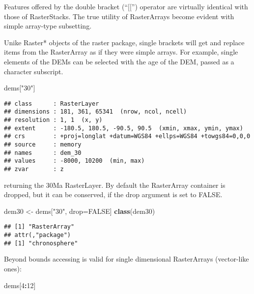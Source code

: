\documentclass[]{article}
\newenvironment{Shaded}{\begin{snugshade}}{\end{snugshade}}
\newcommand{\DecValTok}[1]{\textcolor[rgb]{0.00,0.00,0.81}{#1}}
\newcommand{\KeywordTok}[1]{\textcolor[rgb]{0.13,0.29,0.53}{\textbf{#1}}}
\newcommand{\NormalTok}[1]{#1}
\newcommand{\OperatorTok}[1]{\textcolor[rgb]{0.81,0.36,0.00}{\textbf{#1}}}
\newcommand{\OtherTok}[1]{\textcolor[rgb]{0.56,0.35,0.01}{#1}}
\newcommand{\StringTok}[1]{\textcolor[rgb]{0.31,0.60,0.02}{#1}}
\begin{document}
Features offered by the double bracket (``{[}{[}'') operator are
virtually identical with those of RasterStacks. The true utility of
RasterArrays become evident with simple array-type subsetting.

Unike Raster* objects of the raster package, single brackets will get
and replace items from the RasterArray as if they were simple arrays.
For example, single elements of the DEMs can be selected with the age of
the DEM, passed as a character subscript.

\begin{Shaded}
\begin{Highlighting}[]
\NormalTok{dems[}\StringTok{"30"}\NormalTok{]}
\end{Highlighting}
\end{Shaded}

\begin{verbatim}
## class      : RasterLayer 
## dimensions : 181, 361, 65341  (nrow, ncol, ncell)
## resolution : 1, 1  (x, y)
## extent     : -180.5, 180.5, -90.5, 90.5  (xmin, xmax, ymin, ymax)
## crs        : +proj=longlat +datum=WGS84 +ellps=WGS84 +towgs84=0,0,0 
## source     : memory
## names      : dem_30 
## values     : -8000, 10200  (min, max)
## zvar       : z
\end{verbatim}

returning the 30Ma RasterLayer. By default the RasterArray container is
dropped, but it can be conserved, if the drop argument is set to FALSE.

\begin{Shaded}
\begin{Highlighting}[]
\NormalTok{dem30 <-}\StringTok{ }\NormalTok{dems[}\StringTok{"30"}\NormalTok{, drop=}\OtherTok{FALSE}\NormalTok{]}
\KeywordTok{class}\NormalTok{(dem30)}
\end{Highlighting}
\end{Shaded}

\begin{verbatim}
## [1] "RasterArray"
## attr(,"package")
## [1] "chronosphere"
\end{verbatim}

Beyond bounds accessing is valid for single dimensional RasterArrays
(vector-like ones):

\begin{Shaded}
\begin{Highlighting}[]
\NormalTok{dems[}\DecValTok{4}\OperatorTok{:}\DecValTok{12}\NormalTok{]}
\end{Highlighting}
\end{Shaded}
\end{document}
